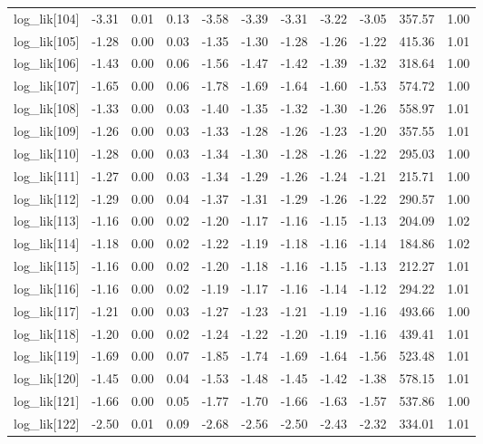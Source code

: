 \begin{table}[ht]
\begin{tabular}{rrrrrrrrrrr}
  log\_lik[104] & -3.31 & 0.01 & 0.13 & -3.58 & -3.39 & -3.31 & -3.22 & -3.05 & 357.57 & 1.00 \\ 
  log\_lik[105] & -1.28 & 0.00 & 0.03 & -1.35 & -1.30 & -1.28 & -1.26 & -1.22 & 415.36 & 1.01 \\ 
  log\_lik[106] & -1.43 & 0.00 & 0.06 & -1.56 & -1.47 & -1.42 & -1.39 & -1.32 & 318.64 & 1.00 \\ 
  log\_lik[107] & -1.65 & 0.00 & 0.06 & -1.78 & -1.69 & -1.64 & -1.60 & -1.53 & 574.72 & 1.00 \\ 
  log\_lik[108] & -1.33 & 0.00 & 0.03 & -1.40 & -1.35 & -1.32 & -1.30 & -1.26 & 558.97 & 1.01 \\ 
  log\_lik[109] & -1.26 & 0.00 & 0.03 & -1.33 & -1.28 & -1.26 & -1.23 & -1.20 & 357.55 & 1.01 \\ 
  log\_lik[110] & -1.28 & 0.00 & 0.03 & -1.34 & -1.30 & -1.28 & -1.26 & -1.22 & 295.03 & 1.00 \\ 
  log\_lik[111] & -1.27 & 0.00 & 0.03 & -1.34 & -1.29 & -1.26 & -1.24 & -1.21 & 215.71 & 1.00 \\ 
  log\_lik[112] & -1.29 & 0.00 & 0.04 & -1.37 & -1.31 & -1.29 & -1.26 & -1.22 & 290.57 & 1.00 \\ 
  log\_lik[113] & -1.16 & 0.00 & 0.02 & -1.20 & -1.17 & -1.16 & -1.15 & -1.13 & 204.09 & 1.02 \\ 
  log\_lik[114] & -1.18 & 0.00 & 0.02 & -1.22 & -1.19 & -1.18 & -1.16 & -1.14 & 184.86 & 1.02 \\ 
  log\_lik[115] & -1.16 & 0.00 & 0.02 & -1.20 & -1.18 & -1.16 & -1.15 & -1.13 & 212.27 & 1.01 \\ 
  log\_lik[116] & -1.16 & 0.00 & 0.02 & -1.19 & -1.17 & -1.16 & -1.14 & -1.12 & 294.22 & 1.01 \\ 
  log\_lik[117] & -1.21 & 0.00 & 0.03 & -1.27 & -1.23 & -1.21 & -1.19 & -1.16 & 493.66 & 1.00 \\ 
  log\_lik[118] & -1.20 & 0.00 & 0.02 & -1.24 & -1.22 & -1.20 & -1.19 & -1.16 & 439.41 & 1.01 \\ 
  log\_lik[119] & -1.69 & 0.00 & 0.07 & -1.85 & -1.74 & -1.69 & -1.64 & -1.56 & 523.48 & 1.01 \\ 
  log\_lik[120] & -1.45 & 0.00 & 0.04 & -1.53 & -1.48 & -1.45 & -1.42 & -1.38 & 578.15 & 1.01 \\ 
  log\_lik[121] & -1.66 & 0.00 & 0.05 & -1.77 & -1.70 & -1.66 & -1.63 & -1.57 & 537.86 & 1.00 \\ 
  log\_lik[122] & -2.50 & 0.01 & 0.09 & -2.68 & -2.56 & -2.50 & -2.43 & -2.32 & 334.01 & 1.01 \\ 

\end{tabular}
\end{table}
